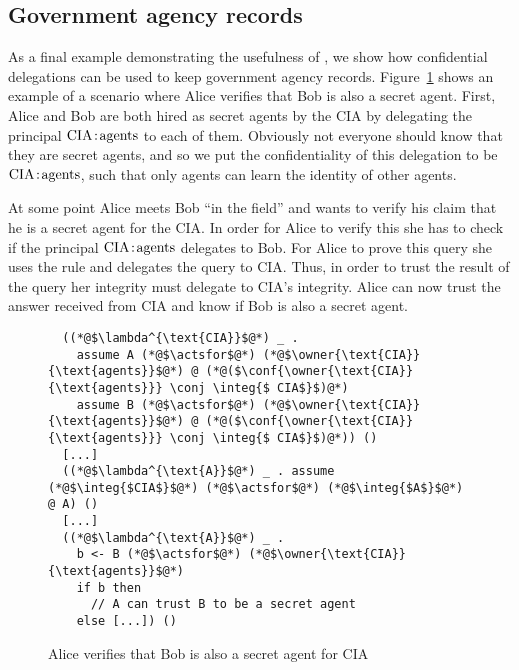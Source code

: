 \subsection{Government agency records}
As a final example demonstrating the usefulness of \lang, we show how confidential delegations can be used to keep government agency records. Figure~\ref{fig:govt-alice-checks-bob} shows an example of a scenario where Alice verifies that Bob is also a secret agent. First, Alice and Bob are both hired as secret agents by the CIA by delegating the principal $\text{CIA}\!:\!\text{agents}$ to each of them. Obviously not everyone should know that they are secret agents, and so we put the confidentiality of this delegation to be $\text{CIA}\!:\!\text{agents}$, such that only agents can learn the identity of other agents.

At some point Alice meets Bob ``in the field'' and wants to verify his claim that he is a secret agent for the CIA. In order for Alice to verify this she has to check if the principal $\text{CIA}\!:\!\text{agents}$ delegates to Bob. For Alice to prove this query she uses the  rule and delegates the query to CIA. Thus, in order to trust the result of the query her integrity must delegate to CIA's integrity.
Alice can now trust the answer received from CIA and know if Bob is also a secret agent.

\begin{figure}
\centering
\begin{lstlisting}
  ((*@$\lambda^{\text{CIA}}$@*) _ .
    assume A (*@$\actsfor$@*) (*@$\owner{\text{CIA}}{\text{agents}}$@*) @ (*@($\conf{\owner{\text{CIA}}{\text{agents}}} \conj \integ{$ CIA$}$)@*)
    assume B (*@$\actsfor$@*) (*@$\owner{\text{CIA}}{\text{agents}}$@*) @ (*@($\conf{\owner{\text{CIA}}{\text{agents}}} \conj \integ{$ CIA$}$)@*)) ()
  [...]
  ((*@$\lambda^{\text{A}}$@*) _ . assume (*@$\integ{$CIA$}$@*) (*@$\actsfor$@*) (*@$\integ{$A$}$@*) @ A) ()
  [...]
  ((*@$\lambda^{\text{A}}$@*) _ .
    b <- B (*@$\actsfor$@*) (*@$\owner{\text{CIA}}{\text{agents}}$@*)
    if b then
      // A can trust B to be a secret agent
    else [...]) ()
\end{lstlisting}
\caption{Alice verifies that Bob is also a secret agent for CIA}
\label{fig:govt-alice-checks-bob}
\end{figure}